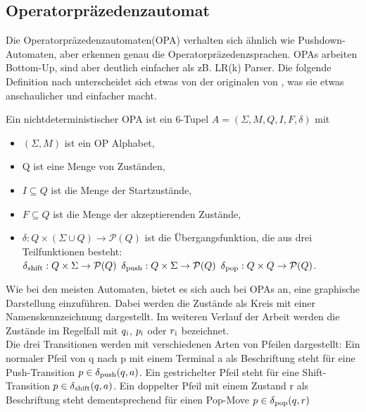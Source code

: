 \subsection{Operatorpräzedenzautomat}
Die Operatorpräzedenzautomaten(OPA) verhalten sich ähnlich wie Pushdown-Automaten, aber erkennen genau die Operatorpräzedenzsprachen. OPAs arbeiten Bottom-Up, sind aber deutlich einfacher als zB. LR(k) Parser. Die folgende Definition nach \cite{mso, modelchecking} unterscheidet sich etwas von der originalen von \cite{precedence_automata}, was sie etwas anschaulicher und einfacher macht.
\begin{definition}[Operatorpräzedenzautomat]
Ein nichtdeterministischer OPA ist ein 6-Tupel $A=(\Sigma, M, Q, I, F, \delta)$ mit
	\begin{itemize}
	\item
	$(\Sigma, M)$ ist ein OP Alphabet,
	\item 
	Q ist eine Menge von Zuständen,
	\item
	$I \subseteq Q$ ist die Menge der Startzustände,
	\item
	$F \subseteq Q$ ist die Menge der akzeptierenden Zustände,
	\item
	$\delta: Q \times (\Sigma \cup Q) \rightarrow \mathcal{P}(Q)$ ist die Übergangsfunktion, die aus drei Teilfunktionen besteht:\\
	$\delta \textsubscript{shift}: Q \times \Sigma \rightarrow \mathcal{P}(Q)$
	$\delta \textsubscript{push}: Q \times \Sigma \rightarrow \mathcal{P}(Q)$
	$\delta \textsubscript{pop}: Q \times Q \rightarrow \mathcal{P}(Q)$.
	\end{itemize}
\end{definition}
Wie bei den meisten Automaten, bietet es sich auch bei OPAs an, eine graphische Darstellung einzuführen. Dabei werden die Zustände als Kreis mit einer Namenskennzeichnung dargestellt. Im weiteren Verlauf der Arbeit werden die Zustände im Regelfall mit $q \textsubscript{i}$, $p \textsubscript{i}$ oder $r \textsubscript{i}$ bezeichnet. \\
Die drei Transitionen werden mit verschiedenen Arten von Pfeilen dargestellt: Ein normaler Pfeil von q nach p mit einem Terminal a als Beschriftung steht für eine Push-Transition $p \in \delta \textsubscript{push}(q, a)$. Ein gestrichelter Pfeil steht für eine Shift-Transition $p \in \delta \textsubscript{shift}(q, a)$. Ein doppelter Pfeil mit einem Zustand r als Beschriftung steht dementsprechend für einen Pop-Move $p \in \delta \textsubscript{pop}(q, r)$\\
